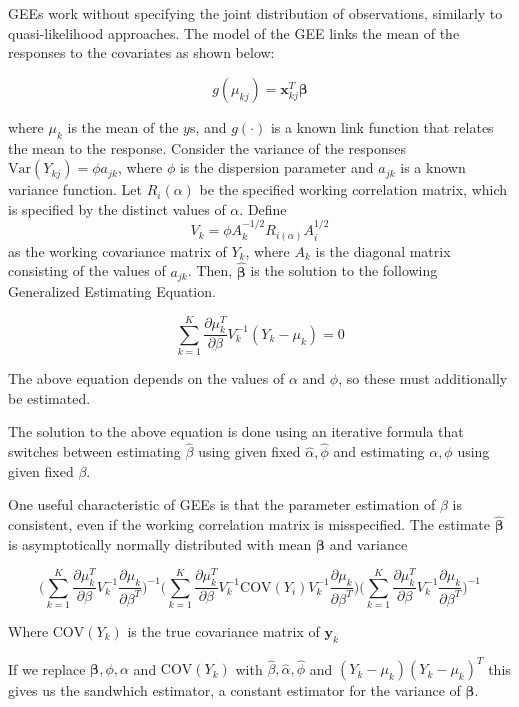 \documentclass[12pt]{article}
\begin{document}
GEEs work without specifying the joint distribution of observations, similarly to quasi-likelihood approaches. The model of the GEE links the mean of the responses to the covariates as shown below:

$$g(\mu_{kj}) = \mathbf{x}_{kj}^T\boldsymbol \beta$$

where $\mu_{k}$ is the mean of the $y$s, and $g(\cdot)$ is a known link function that relates the mean to the response. Consider the variance of the responses $\text{Var}(Y_{kj}) = \phi a_{jk}$, where $\phi$ is the dispersion parameter and $a_{jk}$ is a known variance function. Let $R_i(\alpha)$ be the specified working correlation matrix, which is specified by the distinct values of $\alpha$. Define
$$V_k = \phi A_k^{-1/2} R_{i(\alpha)}A_i^{1/2}$$
as the working covariance matrix of $Y_k$, where $A_k$ is the diagonal matrix consisting of the values of $a_{jk}$. Then, $\hat{\boldsymbol\beta}$ is the solution to the following Generalized Estimating Equation.

$$\sum_{k=1}^K \frac{\partial  \mu_k^T }{\partial \beta } V_{k}^{-1} (Y_k - \mu_k) = 0 $$

The above equation depends on the values of $\alpha$ and $\phi$, so these must additionally be estimated.

The solution to the above equation is done using an iterative formula that switches between estimating $\hat\beta$ using given fixed $\hat \alpha, \hat \phi$ and estimating $\alpha,  \phi$ using given fixed $\beta$.


One useful characteristic of GEEs is that the parameter estimation of $\beta$ is consistent, even if the working correlation matrix is misspecified. The estimate $\hat{\boldsymbol\beta}$ is asymptotically normally distributed with mean $\boldsymbol\beta$ and variance

$$ \big(\sum_{k=1}^K  \frac{\partial  \mu_k^T }{\partial \beta } V_k^{-1} \frac{\partial  \mu_k }{\partial \beta^T } \big)^{-1} \bigg(\sum_{k=1}^K  \frac{\partial  \mu_k^T }{\partial \beta } V_k^{-1}\text{COV}(Y_i)V_{k}^{-1}  \frac{\partial  \mu_k }{\partial \beta^T } \bigg)\big(\sum_{k=1}^K  \frac{\partial  \mu_k^T }{\partial \beta } V_k^{-1} \frac{\partial  \mu_k }{\partial \beta^T } \big)^{-1}$$

Where $\text{COV}(Y_k)$ is the true covariance matrix of $\mathbf{y}_k$

If we replace $ \boldsymbol\beta, \phi, \alpha$ and $\text{COV}(Y_k)$ with $\hat\beta, \hat \alpha, \hat \phi$ and $(Y_k - \mu_k)(Y_k- \mu_k)^T$ this gives us the sandwhich estimator, a constant estimator for the variance of $\boldsymbol\beta$.
\end{document}
